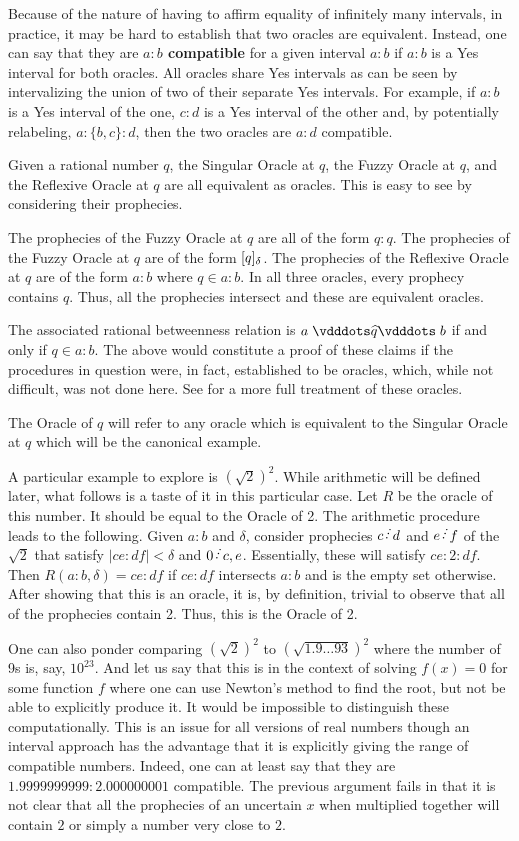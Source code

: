 \documentclass[12pt]{article}
\begin{document}
Because of the nature of having to affirm equality of infinitely many intervals, in practice, it may be hard to establish that two oracles are equivalent. Instead, one can say that they are \textbf{$a:b$ compatible} for a given interval $a:b$ if $a:b$ is a Yes interval for both oracles. All oracles share Yes intervals as can be seen by intervalizing the union of two of their separate Yes intervals. For example, if $a:b$ is a Yes interval of the one, $c:d$ is a Yes interval of the other and, by potentially relabeling, $a:\{b,c\}:d$, then the two oracles are $a:d$ compatible.  


 Given a rational number $q$, the Singular Oracle at $q$, the Fuzzy Oracle at $q$, and the Reflexive Oracle at $q$ are all equivalent as oracles. This is easy to see by considering their prophecies. 
 
 The prophecies of the Fuzzy Oracle at $q$ are all of the form $q:q$. The prophecies of the Fuzzy Oracle at $q$ are of the form $[q]_{\delta}$. The prophecies of the Reflexive Oracle at $q$ are of the form $a:b$ where $q \in a:b$. In all three oracles, every prophecy contains $q$. Thus, all the prophecies intersect and these are equivalent oracles. 

The associated rational betweenness relation is $a \xora[q] b$ if and only if $q \in a:b$. The above would constitute a proof of these claims if the procedures in question were, in fact, established to be oracles, which, while not difficult, was not done here. See \cite{taylor23main} for a more full treatment of these oracles. 

The Oracle of $q$ will refer to any oracle which is equivalent to the Singular Oracle at $q$ which will be the canonical example. 

A particular example to explore is $(\sqrt{2})^2$. While arithmetic will be defined later, what follows is a taste of it in this particular case. Let $R$ be the oracle of this number. It should be equal to the Oracle of 2. The arithmetic procedure leads to the following. Given $a:b$ and $\delta$, consider prophecies $c\lte d$ and $e\lte f$ of the $\sqrt{2}$ that satisfy $|ce:df| < \delta$ and $0\lte {c,e}$. Essentially, these will satisfy  $ce:2:df$. Then $R(a:b, \delta) = ce:df$ if $ce:df$ intersects $a:b$ and is the empty set otherwise. After showing that this is an oracle, it is, by definition, trivial to observe that all of the prophecies contain 2. Thus, this is the Oracle of 2. 

One can also ponder comparing $(\sqrt{2})^2$ to $(\sqrt{1.9\ldots93})^2$ where the number of 9s is, say, $10^{23}$. And let us say that this is in the context of solving $f(x) = 0$ for some function $f$ where one can use Newton's method to find the root, but not be able to explicitly produce it. It would be impossible to distinguish these computationally. This is an issue for all versions of real numbers though an interval approach has the advantage that it is explicitly giving the range of compatible numbers. Indeed, one can at least say that they are $1.9999999999:2.000000001$ compatible. The previous argument fails in that it is not clear that all the prophecies of an uncertain $x$ when multiplied together will contain $2$ or simply a number very close to $2$. 
\end{document}

